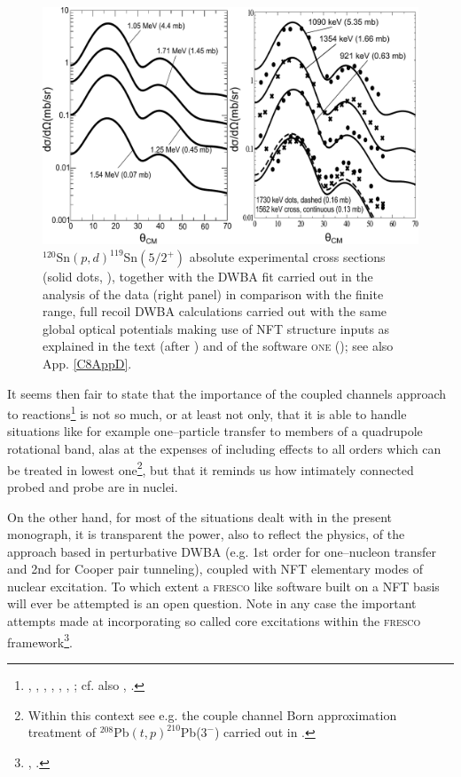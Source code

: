     \begin{figure}
    \centerline{\includegraphics*[width=\textwidth,angle=0]{C6/figs_C6/cross_teor_exp.pdf}}
    \caption{$^{120}$Sn$(p,d)^{119}$Sn$(5/2^+)$ absolute experimental cross sections (solid dots, \cite{Dickey:82}), together with the DWBA fit carried out in the analysis of the data (right panel) in comparison with the finite range, full recoil DWBA calculations carried out with the same global optical potentials  making use of NFT structure inputs as explained in the text (after \cite{Idini:15}) and of the software \textsc{one} (\cite{Potel:12b}); see also App. \ref{C8AppD}.}\label{fig6.2.3}
    \end{figure}
  
  It seems then fair to state that the importance of the coupled channels approach to reactions\footnote{ \cite{Thompson:88}, \cite{Thompson:13}, \cite{Tamura:70}, \cite{Ascuitto:69}, \cite{Ascuitto:70}, \cite{Ascuitto:71}, \cite{Ascuitto:72}; cf. also \cite{Fernandez:10}, \cite{Fernandez:10b}.} is not so much, or at least not only, that it is able to handle situations like for example one--particle transfer to members of a quadrupole rotational band, alas at the expenses of including effects to all orders which can be treated in lowest one\footnote{Within this context see e.g. the couple channel Born approximation treatment of $^{208}$Pb$(t,p)^{210}$Pb($3^-$) carried out in \cite{Flynn:72b}.}, but that it reminds us how intimately connected  probed and probe are in nuclei.
  
  
  On the other hand, for most of the situations dealt with in the present monograph, it is transparent the power, also to reflect the physics, of the approach based in perturbative DWBA (e.g. 1st order for one--nucleon transfer and 2nd for Cooper pair tunneling), coupled  
  with NFT elementary modes of nuclear excitation.
  To which extent a \textsc{fresco} like software built on a NFT basis will ever be attempted is an open question. Note in any case the important attempts made at incorporating so called core excitations within the \textsc{fresco} framework\footnote{\cite{Fernandez:10}, \cite{Fernandez:10b}.}. 
  
